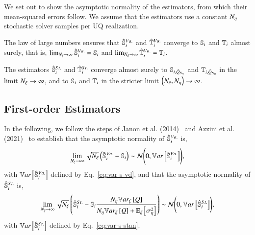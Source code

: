 We set out to show the asymptotic normality of the estimators, from which their mean-squared errors follow.
We assume that the estimators use a constant $\Neta$ stochastic solver samples per UQ realization.

The law of large numbers ensures that $\unpollSsalt{i}$ and $\unpollTsalt{i}$ converge to $\S{i}$ and $\T{i}$ almost surely, that is, $\lim_{\Nxi \rightarrow \infty} \unpollSsalt{i} = \S{i}$ and $\lim_{\Nxi \rightarrow \infty} \unpollTsalt{i} = \T{i}$.

The estimators $\pollSsalt{i}$ and $\pollTsalt{i}$ converge almost surely to $\Spoll{i}$ and $\Tpoll{i}$ in the limit $\Nxi \rightarrow \infty$, and to $\S{i}$ and $\T{i}$ in the stricter limit $\left( \Nxi, \Neta\right) \rightarrow \infty$.

\subsection{First-order Estimators}\label{sec:proof-first-order}
In the following, we follow the steps of Janon et al. (2014)~\cite{janon-etal-2014} and Azzini et al. (2021)~\cite{azzini-etal-2021} to establish that the asymptotic normality of $\unpollSsalt{i}$ is,
\begin{equation}
    \lim_{\Nxi \rightarrow \infty} \sqrt{\Nxi} \left( \unpollSsalt{i} - \S{i} \right) \sim \mathcal{N} \Biggl( 0, \Var{\unpollSsalt{i}} \Biggr) ,
\end{equation}
with $\Var{\unpollSsalt{i}}$ defined by Eq.~\eqref{eq:var-s-vd},
and that the asymptotic normality of $\pollSsalt{i}$ is,
\begin{equation}
    \lim_{\Nxi \rightarrow \infty} \sqrt{\Nxi} \left( \pollSsalt{i} - \S{i}\frac{\Neta\Vxi{Q}}{\Neta\Vxi{Q} + \EExi{\Sigsqeta}} \right) \sim \mathcal{N} \Biggl( 0, \Var{\pollSsalt{i}} \Biggr) ,
\end{equation}
with $\Var{\pollSsalt{i}}$ defined by Eq.~\eqref{eq:var-s-stan}.


